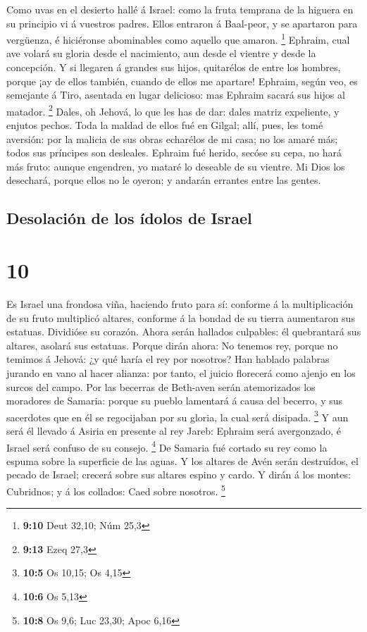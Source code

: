  Como uvas en el desierto hallé á Israel: como la fruta
temprana de la higuera en su principio vi á vuestros padres. Ellos
entraron á Baal-peor, y se apartaron para vergüenza, é hiciéronse
abominables como aquello que amaron. \footnote{\textbf{9:10} Deut 32,10;
  Núm 25,3}  Ephraim, cual ave volará su gloria desde el
nacimiento, aun desde el vientre y desde la concepción. 
Y si llegaren á grandes sus hijos, quitarélos de entre los hombres,
porque ¡ay de ellos también, cuando de ellos me apartare!
 Ephraim, según veo, es semejante á Tiro, asentada en
lugar delicioso: mas Ephraim sacará sus hijos al matador. \footnote{\textbf{9:13}
  Ezeq 27,3}  Dales, oh Jehová, lo que les has de dar:
dales matriz expeliente, y enjutos pechos.  Toda la
maldad de ellos fué en Gilgal; allí, pues, les tomé aversión: por la
malicia de sus obras echarélos de mi casa; no los amaré más; todos sus
príncipes son desleales.  Ephraim fué herido, secóse su
cepa, no hará más fruto: aunque engendren, yo mataré lo deseable de su
vientre.  Mi Dios los desechará, porque ellos no le
oyeron; y andarán errantes entre las gentes.

\hypertarget{desolaciuxf3n-de-los-uxeddolos-de-israel}{%
\subsection{Desolación de los ídolos de
Israel}\label{desolaciuxf3n-de-los-uxeddolos-de-israel}}

\hypertarget{section-9}{%
\section{10}\label{section-9}}

 Es Israel una frondosa viña, haciendo fruto para sí:
conforme á la multiplicación de su fruto multiplicó altares, conforme á
la bondad de su tierra aumentaron sus estatuas.  Dividióse
su corazón. Ahora serán hallados culpables: él quebrantará sus altares,
asolará sus estatuas.  Porque dirán ahora: No tenemos rey,
porque no temimos á Jehová: ¿y qué haría el rey por nosotros?
 Han hablado palabras jurando en vano al hacer alianza:
por tanto, el juicio florecerá como ajenjo en los surcos del campo.
 Por las becerras de Beth-aven serán atemorizados los
moradores de Samaria: porque su pueblo lamentará á causa del becerro, y
sus sacerdotes que en él se regocijaban por su gloria, la cual será
disipada. \footnote{\textbf{10:5} Os 10,15; Os 4,15}  Y
aun será él llevado á Asiria en presente al rey Jareb: Ephraim será
avergonzado, é Israel será confuso de su consejo. \footnote{\textbf{10:6}
  Os 5,13}  De Samaria fué cortado su rey como la espuma
sobre la superficie de las aguas.  Y los altares de Avén
serán destruídos, el pecado de Israel; crecerá sobre sus altares espino
y cardo. Y dirán á los montes: Cubridnos; y á los collados: Caed sobre
nosotros. \footnote{\textbf{10:8} Os 9,6; Luc 23,30; Apoc 6,16}

